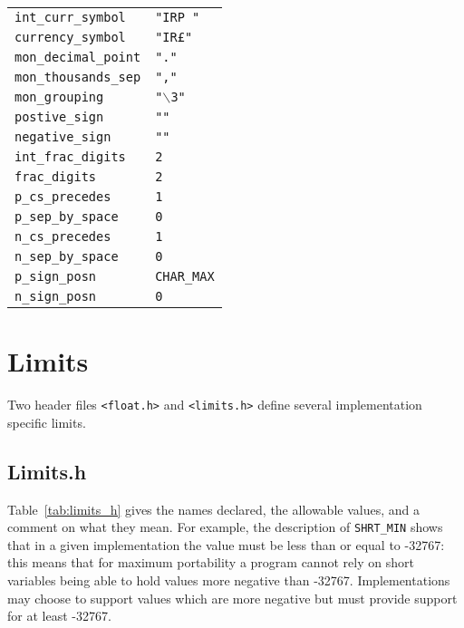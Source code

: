    \begin{tabular}{ll}
     \texttt{int\_curr\_symbol}   & \texttt{"IRP "}    \\
     \texttt{currency\_symbol}    & \texttt{"IR\pounds"}    \\
     \texttt{mon\_decimal\_point} & \texttt{"."}    \\
     \texttt{mon\_thousands\_sep} & \texttt{","}    \\
     \texttt{mon\_grouping}       & \texttt{"$\backslash$3"}    \\
     \texttt{postive\_sign}       & \texttt{""}    \\
     \texttt{negative\_sign}      & \texttt{""}    \\
     \texttt{int\_frac\_digits}   & \texttt{2}    \\
     \texttt{frac\_digits}        & \texttt{2}    \\
     \texttt{p\_cs\_precedes}     & \texttt{1}    \\
     \texttt{p\_sep\_by\_space}   & \texttt{0}    \\
     \texttt{n\_cs\_precedes}     & \texttt{1}    \\
     \texttt{n\_sep\_by\_space}   & \texttt{0}    \\
     \texttt{p\_sign\_posn}       & \texttt{CHAR\_MAX}    \\
     \texttt{n\_sign\_posn}       & \texttt{0}    \\
\end{tabular}


  

 
        \section{Limits}
        

  

  Two header files \texttt{<float.h>} and
   \texttt{<limits.h>} define several implementation specific
   limits.


  \subsection{Limits.h}
   

   Table~\ref{tab:limits_h} gives the names declared, the allowable values,
    and a comment on what they mean.  For example, the
    description of \texttt{SHRT\_MIN} shows that in a given implementation
    the value must be less than or equal to -32767: this means
    that for maximum portability a program cannot rely on short
    variables being able to hold values more negative than
    -32767.  Implementations may choose to support values which
    are more negative but must provide support for at least
    -32767.

